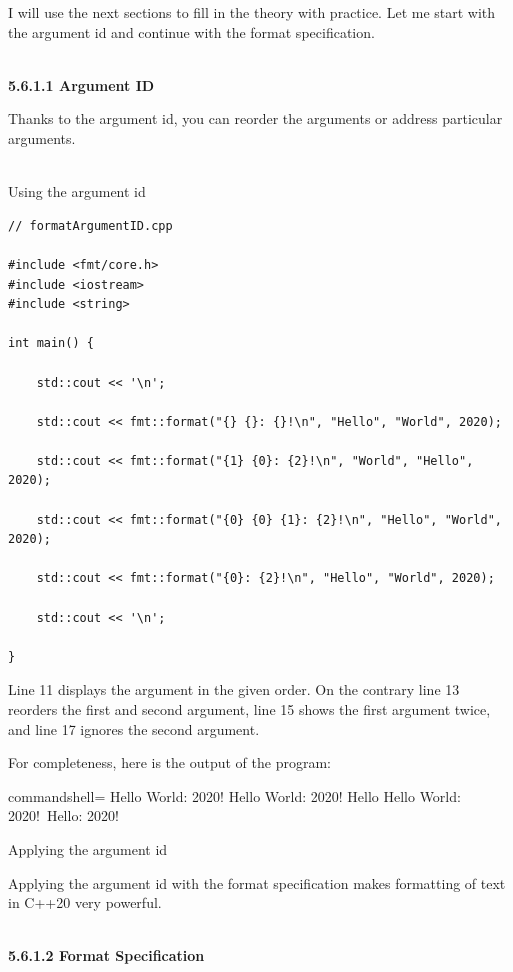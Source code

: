 I will use the next sections to fill in the theory with practice. Let me start with the argument id and continue with the format specification.

\hspace*{\fill} \\ %
\noindent
\textbf{5.6.1.1\hspace{0.2cm} Argument ID}

Thanks to the argument id, you can reorder the arguments or address particular arguments.

\hspace*{\fill} \\ %
\noindent
Using the argument id
\begin{lstlisting}[style=styleCXX]
// formatArgumentID.cpp

#include <fmt/core.h>
#include <iostream>
#include <string>

int main() {
	
	std::cout << '\n';
	
	std::cout << fmt::format("{} {}: {}!\n", "Hello", "World", 2020);
	
	std::cout << fmt::format("{1} {0}: {2}!\n", "World", "Hello", 2020);
	
	std::cout << fmt::format("{0} {0} {1}: {2}!\n", "Hello", "World", 2020);
	
	std::cout << fmt::format("{0}: {2}!\n", "Hello", "World", 2020);
	
	std::cout << '\n';

}
\end{lstlisting}

Line 11 displays the argument in the given order. On the contrary line 13 reorders the first and second argument, line 15 shows the first argument twice, and line 17 ignores the second argument.

For completeness, here is the output of the program:

\begin{tcblisting}{commandshell={}}
Hello World: 2020!
Hello World: 2020!
Hello Hello World: 2020!\
Hello: 2020!
\end{tcblisting}

\begin{center}
Applying the argument id
\end{center}

Applying the argument id with the format specification makes formatting of text in C++20 very powerful.

\hspace*{\fill} \\ %
\noindent
\textbf{5.6.1.2\hspace{0.2cm} Format Specification}

